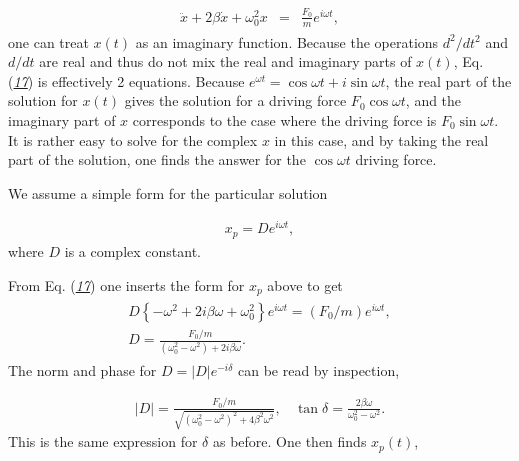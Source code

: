 \documentclass[letterpaper,10pt,english]{sphinxmanual}
\begin{document}
\begin{equation*}
\begin{split}
\begin{eqnarray}
\label{eq:compdrive} \tag{17}
\ddot{x}+2\beta\dot{x}+\omega_0^2x&=&\frac{F_0}{m}e^{i\omega t},
\end{eqnarray}
\end{split}
\end{equation*}
one can treat \(x(t)\) as an imaginary function. Because the operations
\(d^2/dt^2\) and \(d/dt\) are real and thus do not mix the real and
imaginary parts of \(x(t)\), Eq. ({\hyperref[\detokenize{chapter4:eq:compdrive}]{\emph{17}}}) is effectively 2
equations. Because \(e^{\omega t}=\cos\omega t+i\sin\omega t\), the real
part of the solution for \(x(t)\) gives the solution for a driving force
\(F_0\cos\omega t\), and the imaginary part of \(x\) corresponds to the
case where the driving force is \(F_0\sin\omega t\). It is rather easy
to solve for the complex \(x\) in this case, and by taking the real part
of the solution, one finds the answer for the \(\cos\omega t\) driving
force.

We assume a simple form for the particular solution




\begin{equation*}
\begin{split}
\begin{equation}
x_p=De^{i\omega t},
\label{_auto11} \tag{18}
\end{equation}
\end{split}
\end{equation*}
where \(D\) is a complex constant.

From Eq. ({\hyperref[\detokenize{chapter4:eq:compdrive}]{\emph{17}}}) one inserts the form for \(x_p\) above to get
\begin{equation*}
\begin{split}
\begin{eqnarray}
D\left\{-\omega^2+2i\beta\omega+\omega_0^2\right\}e^{i\omega t}=(F_0/m)e^{i\omega t},\\
\nonumber
D=\frac{F_0/m}{(\omega_0^2-\omega^2)+2i\beta\omega}.
\end{eqnarray}
\end{split}
\end{equation*}
The norm and phase for \(D=|D|e^{-i\delta}\) can be read by inspection,




\begin{equation*}
\begin{split}
\begin{equation}
|D|=\frac{F_0/m}{\sqrt{(\omega_0^2-\omega^2)^2+4\beta^2\omega^2}},~~~~\tan\delta=\frac{2\beta\omega}{\omega_0^2-\omega^2}.
\label{_auto12} \tag{19}
\end{equation}
\end{split}
\end{equation*}
This is the same expression for \(\delta\) as before. One then finds \(x_p(t)\),
\end{document}
